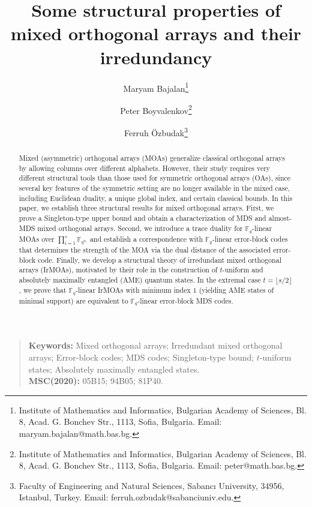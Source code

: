 \documentclass[11pt]{article}
\newtheorem{Definition and Notation}[Theorem]{Definition and Notation}
\begin{document}
\author{
  Maryam Bajalan\thanks{Institute of Mathematics and Informatics, Bulgarian Academy of Sciences, Bl. 8, Acad. G. Bonchev Str., 1113, Sofia, Bulgaria. Email: maryam.bajalan@math.bas.bg.} \and
  Peter Boyvalenkov\thanks{Institute of Mathematics and Informatics, Bulgarian Academy of Sciences, Bl. 8, Acad. G. Bonchev Str., 1113, Sofia, Bulgaria. Email: peter@math.bas.bg.}\and
  Ferruh Özbudak\thanks{Faculty of Engineering and Natural Sciences, Sabancı University, 34956, Istanbul, Turkey.  Email: ferruh.ozbudak@sabanciuniv.edu.}
  }
  

\title{Some structural properties of mixed orthogonal arrays and their irredundancy}


\date{}



\maketitle
\begin{abstract}
Mixed (asymmetric) orthogonal arrays (MOAs) generalize classical orthogonal arrays by allowing columns over different alphabets. However, their study requires very different structural tools than those used for symmetric orthogonal arrays (OAs), since several key features of the symmetric setting are no longer available in the mixed case, including Euclidean duality, a unique global index, and certain classical bounds. In this paper, we establish three structural results for mixed orthogonal arrays. First, we prove a Singleton-type upper bound and obtain a characterization of MDS and almost-MDS mixed orthogonal arrays. Second, we introduce a trace duality for $\mathbb{F}_q$-linear MOAs over 
$\prod_{i=1}^{s} \mathbb{F}_{q^{n_i}}$ and establish a correspondence with $\mathbb{F}_q$-linear error-block codes that determines the strength of the MOA via the dual distance of the associated error-block code. Finally, we develop a structural theory of irredundant mixed orthogonal arrays (IrMOAs), motivated by their role in the construction of $t$-uniform and absolutely maximally entangled (AME) quantum states. In the extremal case $t=\lfloor s/2\rfloor$, we prove that $\mathbb{F}_q$-linear IrMOAs with minimum index $1$ (yielding AME states of minimal support) are equivalent to $\mathbb{F}_q$-linear error-block MDS codes.
\end{abstract}
\begin{quotation}
\noindent \textbf{Keywords:} Mixed orthogonal arrays; Irredundant mixed orthogonal arrays; Error-block codes; MDS codes; Singleton-type bound; $t$-uniform states; Absolutely maximally entangled states.\\
\textbf{MSC(2020):} 05B15; 94B05; 81P40.
\end{quotation}
\end{document}
